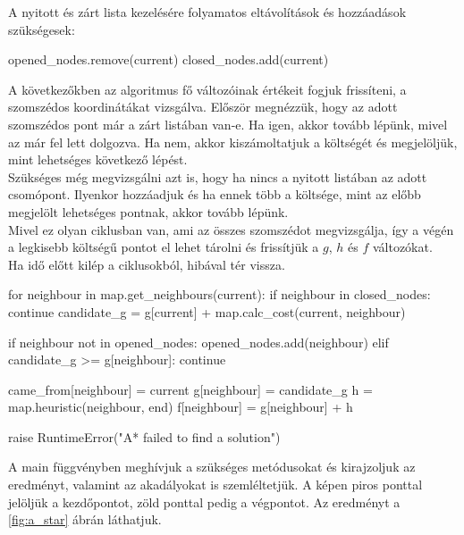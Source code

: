 \bigskip
\bigskip

A nyitott és zárt lista kezelésére folyamatos eltávolítások és hozzáadások szükségesek:

\begin{python}
	opened_nodes.remove(current)
        closed_nodes.add(current)
\end{python}

\bigskip
\bigskip

A következőkben az algoritmus fő változóinak értékeit fogjuk frissíteni, a szomszédos koordinátákat vizsgálva. Először megnézzük, hogy az adott szomszédos pont már a zárt listában van-e. Ha igen, akkor tovább lépünk, mivel az már fel lett dolgozva. Ha nem, akkor kiszámoltatjuk a költségét és megjelöljük, mint lehetséges következő lépést.\\

Szükséges még megvizsgálni azt is, hogy ha nincs a nyitott listában az adott csomópont. Ilyenkor hozzáadjuk és ha ennek több a költsége, mint az előbb megjelölt lehetséges pontnak, akkor tovább lépünk.\\

Mivel ez olyan ciklusban van, ami az összes szomszédot megvizsgálja, így a végén a legkisebb költségű pontot el lehet tárolni és frissítjük a $ g $, $ h $ és $ f $ változókat.\\

Ha idő előtt kilép a ciklusokból, hibával tér vissza.

\begin{python}
	for neighbour in map.get_neighbours(current):
            if neighbour in closed_nodes:
                continue
            candidate_g = g[current] + map.calc_cost(current, neighbour)

            if neighbour not in opened_nodes:
                opened_nodes.add(neighbour)
            elif candidate_g >= g[neighbour]:
                continue

            came_from[neighbour] = current
            g[neighbour] = candidate_g
            h = map.heuristic(neighbour, end)
            f[neighbour] = g[neighbour] + h

    raise RuntimeError("A* failed to find a solution")
\end{python}

\bigskip
\bigskip

A main függvényben meghívjuk a szükséges metódusokat és kirajzoljuk az eredményt, valamint az akadályokat is szemléltetjük. A képen piros ponttal jelöljük a kezdőpontot, zöld ponttal pedig a végpontot. Az eredményt a \ref{fig:a_star} ábrán láthatjuk.

